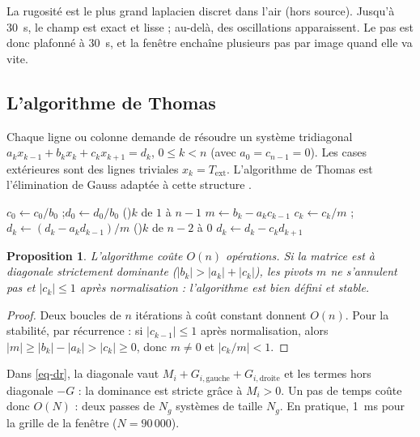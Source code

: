 \documentclass[11pt,a4paper]{article}
\newtheorem{proposition}{Proposition}
\theoremstyle{definition}
\theoremstyle{remark}
\newcommand{\Text}{T_{\mathrm{ext}}}
\begin{document}
La rugosité est le plus grand laplacien discret dans l'air (hors source). Jusqu'à
\qty{30}{\second}, le champ est exact et lisse ; au-delà, des oscillations
apparaissent. Le pas est donc plafonné à \qty{30}{\second}, et la fenêtre enchaîne
plusieurs pas par image quand elle va vite.

\subsection{L'algorithme de Thomas}

Chaque ligne ou colonne demande de résoudre un système tridiagonal
$a_kx_{k-1}+b_kx_k+c_kx_{k+1} = d_k$, $0\le k<n$ (avec $a_0 = c_{n-1} = 0$). Les
cases extérieures sont des lignes triviales $x_k = \Text$. L'algorithme de Thomas
est l'élimination de Gauss adaptée à cette structure \cite{golub2013}.

\begin{algorithm}[H]
\caption{Algorithme de Thomas}
$c_0 \leftarrow c_0/b_0$ ;\quad $d_0 \leftarrow d_0/b_0$\;
\Pour(){$k$ de $1$ à $n-1$}{
  $m \leftarrow b_k - a_k c_{k-1}$\;
  $c_k \leftarrow c_k/m$ ;\quad $d_k \leftarrow (d_k - a_k d_{k-1})/m$\;
}
\Pour(){$k$ de $n-2$ à $0$}{
  $d_k \leftarrow d_k - c_k d_{k+1}$\;
}
\end{algorithm}

\begin{proposition}
L'algorithme coûte $O(n)$ opérations. Si la matrice est à diagonale strictement
dominante ($|b_k| > |a_k|+|c_k|$), les pivots $m$ ne s'annulent pas et
$|c_k|\le 1$ après normalisation : l'algorithme est bien défini et stable.
\end{proposition}

\begin{proof}
Deux boucles de $n$ itérations à coût constant donnent $O(n)$. Pour la stabilité,
par récurrence : si $|c_{k-1}|\le1$ après normalisation, alors
$|m| \ge |b_k| - |a_k| > |c_k| \ge 0$, donc $m\ne0$ et $|c_k/m| < 1$.
\end{proof}

Dans \eqref{eq-dr}, la diagonale vaut $M_i + G_{i,\mathrm{gauche}} + G_{i,\mathrm{droite}}$
et les termes hors diagonale $-G$ : la dominance est stricte grâce à $M_i>0$. Un pas
de temps coûte donc $O(N)$ : deux passes de $N_g$ systèmes de taille $N_g$. En
pratique, \qty{1}{\milli\second} pour la grille de la fenêtre ($N = 90\,000$).
\end{document}
